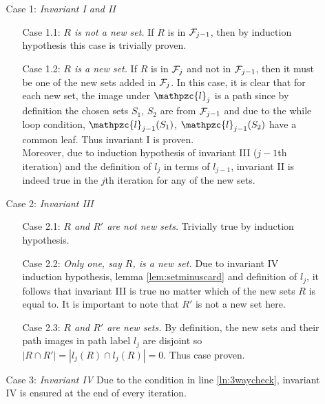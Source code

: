 \documentclass{fsttcs}
\def\cF{{\cal F}}
\def\cl{\mathpzc{l}}
\begin{document}
  \noindent
  \begin{enumerate} %
  \item []
  \begin{enumerate}
  \item [Case 1:] {\em Invariant I and II} 
    \begin{enumerate}
    \item [Case 1.1:] {\em $R$ is not a new set.} If $R$ is in
      $\cF_{j-1}$, then by induction hypothesis this case is trivially
      proven.
    \item [Case 1.2:] {\em $R$ is a new set.} If $R$ is in $\cF_{j}$
      and not in $\cF_{j-1}$, then it must be one of the new sets
      added in $\cF_j$. In this case, it is clear that for each new
      set, the image under $\cl_j$ is a path since by definition the
      chosen sets $S_1$, $S_2$ are from $\cF_{j-1}$ and due to the
      while loop condition, $\cl_{j-1}(S_1)$, $\cl_{j-1}(S_2)$ have a
      common leaf. Thus invariant I is proven.\\
      Moreover, due to induction hypothesis of invariant III ($j-1$th
      iteration) and the definition of $l_j$ in terms of $l_{j-1}$,
      invariant II is indeed true in the $j$th iteration for any of
      the new sets.
   \end{enumerate}
  \item [Case 2:] {\em Invariant III}
    \begin{enumerate}
    \item [Case 2.1:] {\em $R$ and $R'$ are not new sets.} Trivially
      true by induction hypothesis.
    \item [Case 2.2:] {\em Only one, say $R$, is a new set.} Due to
  invariant IV induction hypothesis, lemma \ref{lem:setminuscard} and
      definition of $l_j$, it follows that invariant III is true no matter which of
      the new sets $R$ is equal to. It is important to note that $R'$ is not a new set here.
    \item [Case 2.3:] {\em $R$ and $R'$ are new sets.} By definition,
      the new sets and their path images in path label $l_j$ are
      disjoint so $|R \cap R'| = |l_j(R) \cap l_j(R)| = 0$. Thus case
      proven.
    \end{enumerate}
  \item [Case 3:] {\em Invariant IV}
    Due to the condition in line \ref{ln:3waycheck}, invariant IV is
    ensured at the end of every iteration.

\end{enumerate}
\end{enumerate}
\end{document}
